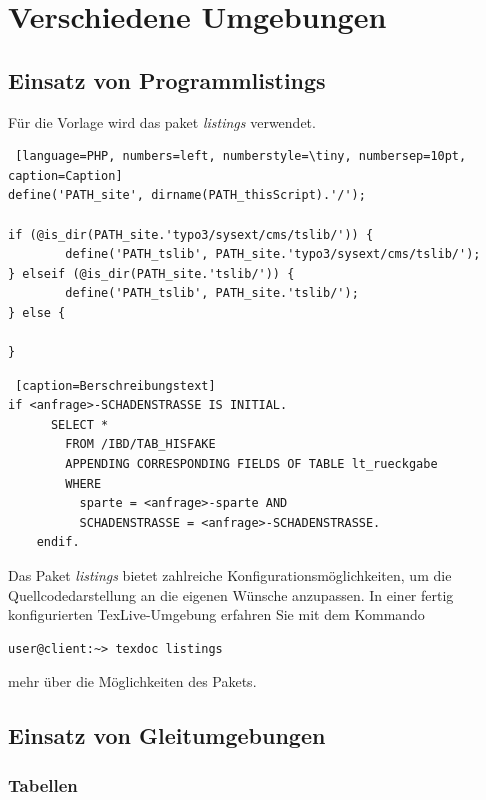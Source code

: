 
\section{Verschiedene Umgebungen}
\label{sec:Umgebungen}

\subsection{Einsatz von Programmlistings}
Für die Vorlage wird das paket \textit{listings} verwendet. \\
\begin{lstlisting} [language=PHP, numbers=left, numberstyle=\tiny, numbersep=10pt, caption=Caption]
define('PATH_site', dirname(PATH_thisScript).'/');

if (@is_dir(PATH_site.'typo3/sysext/cms/tslib/')) {
        define('PATH_tslib', PATH_site.'typo3/sysext/cms/tslib/');
} elseif (@is_dir(PATH_site.'tslib/')) {
        define('PATH_tslib', PATH_site.'tslib/');
} else {
      
}
\end{lstlisting}


\begin{lstlisting} [caption=Berschreibungstext]
if <anfrage>-SCHADENSTRASSE IS INITIAL.
      SELECT *
        FROM /IBD/TAB_HISFAKE
        APPENDING CORRESPONDING FIELDS OF TABLE lt_rueckgabe
        WHERE
          sparte = <anfrage>-sparte AND
          SCHADENSTRASSE = <anfrage>-SCHADENSTRASSE.
    endif.
\end{lstlisting}

Das Paket \textit{listings} bietet zahlreiche Konfigurationsmöglichkeiten, um die Quellcodedarstellung an die eigenen Wünsche anzupassen. In einer fertig konfigurierten TexLive-Umgebung erfahren Sie mit dem Kommando

\begin{verbatim}
user@client:~> texdoc listings
\end{verbatim}

mehr über die Möglichkeiten des Pakets.

\subsection{Einsatz von Gleitumgebungen}
\subsubsection{Tabellen}

